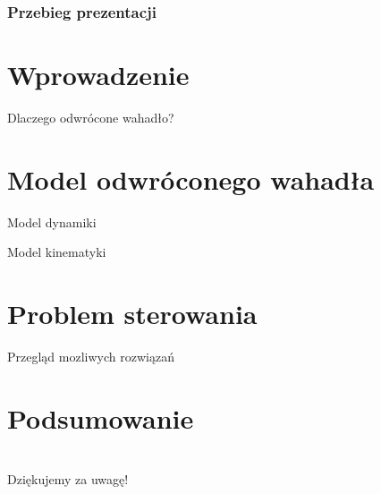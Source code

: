 



\frame{\titlepage}

\begin{frame}
  \frametitle{Przebieg prezentacji}
  \tableofcontents
\end{frame}


\section{Wprowadzenie}
\begin{frame}{Dlaczego odwrócone wahadło?}

\end{frame}

\section{Model odwróconego wahadła}
\begin{frame}{Model dynamiki}
\end{frame}

\begin{frame}{Model kinematyki}
\end{frame}

\section{Problem sterowania}
\begin{frame}{Przegląd mozliwych rozwiązań}
\end{frame}



\section{Podsumowanie}




\section{}
\begin{frame}
  \begin{center}
    \huge
    Dziękujemy za uwagę!
  \end{center}
 

\end{frame}



